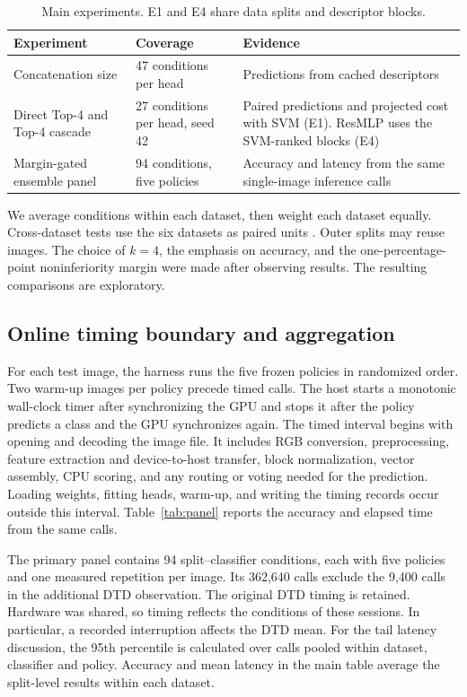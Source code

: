 \documentclass[10pt,a4paper,fleqn]{article}
\begin{document}
\begin{table}[htbp]
\centering
\caption{Main experiments. E1 and E4 share data splits and descriptor blocks.}
\label{tab:protocolo}
\begin{tabular}{@{}p{}p{}p{}@{}}
\toprule
Experiment & Coverage & Evidence \\
\midrule
Concatenation size & 47 conditions per head & Predictions from cached descriptors \\
\addlinespace
Direct Top-4 and Top-4 cascade & 27 conditions per head, seed 42 & Paired predictions and projected cost with SVM (E1). ResMLP uses the SVM-ranked blocks (E4) \\
\addlinespace
Margin-gated ensemble panel & 94 conditions, five policies & Accuracy and latency from the same single-image inference calls \\
\bottomrule
\end{tabular}
\end{table}

We average conditions within each dataset, then weight each dataset equally. Cross-dataset tests use the six datasets as paired units \citep{demsar2006statistical}. Outer splits may reuse images. The choice of $k=4$, the emphasis on accuracy, and the one-percentage-point noninferiority margin were made after observing results. The resulting comparisons are exploratory.

\subsection{Online timing boundary and aggregation}

For each test image, the harness runs the five frozen policies in randomized order. Two warm-up images per policy precede timed calls. The host starts a monotonic wall-clock timer after synchronizing the GPU and stops it after the policy predicts a class and the GPU synchronizes again. The timed interval begins with opening and decoding the image file. It includes RGB conversion, preprocessing, feature extraction and device-to-host transfer, block normalization, vector assembly, CPU scoring, and any routing or voting needed for the prediction. Loading weights, fitting heads, warm-up, and writing the timing records occur outside this interval. Table~\ref{tab:panel} reports the accuracy and elapsed time from the same calls.

The primary panel contains 94 split--classifier conditions, each with five policies and one measured repetition per image. Its 362,640 calls exclude the 9,400 calls in the additional DTD observation. The original DTD timing is retained. Hardware was shared, so timing reflects the conditions of these sessions. In particular, a recorded interruption affects the DTD mean. For the tail latency discussion, the 95th percentile is calculated over calls pooled within dataset, classifier and policy. Accuracy and mean latency in the main table average the split-level results within each dataset.
\end{document}
